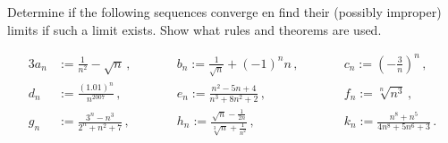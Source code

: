 \documentclass[week=3]{homework}
\begin{document}
\begin{questions}
    
	    \question
	    Determine if the following sequences converge en find their (possibly improper) limits if such a limit exists. Show what rules and theorems are used.
	    
	    \begin{alignat*}{3}
	    a_n &:= \frac{1}{n^2} - \sqrt n\,,  \qquad &&b_n := \frac{1}{\sqrt n } + (-1)^nn\,,\qquad &&c_n := \left(-\frac{3}{n}\right)^n\,, \\
	    d_n &:= \frac{(1.01)^n}{n^{2007}}\,, \qquad &&e_n := \frac{n^2-5n+4}{n^3+8n^2+2}\,, \qquad &&f_n := \sqrt[n]{n^3}\,, \\
	    g_n &:= \frac{3^n - n^3}{2^n + n^2 + 7}\,, \qquad &&h_n := \frac{\sqrt n - \frac{1}{2n}}{\sqrt[3]{n} + \frac{1}{n^2}}\,, \qquad &&k_n := \frac{n^8 + n^5}{4n^8 + 5n^6 + 3}\,.
	    \end{alignat*}
	    

\end{questions}
\end{document}
